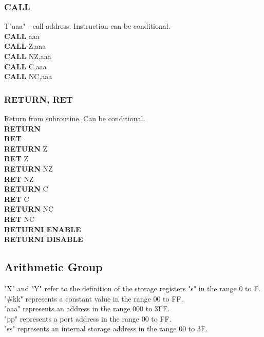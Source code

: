         \subsubsection{CALL}
            T"aaa" - call address. Instruction can be conditional.\\
            \textbf{CALL} aaa\\
            \textbf{CALL} Z,aaa\\
            \textbf{CALL} NZ,aaa\\
            \textbf{CALL} C,aaa\\
            \textbf{CALL} NC,aaa\\

        \subsubsection{RETURN, RET}
            Return from subroutine. Can be conditional.\\
            \textbf{RETURN}\\
            \textbf{RET}\\
            \textbf{RETURN} Z\\
            \textbf{RET} Z\\
            \textbf{RETURN} NZ\\
            \textbf{RET} NZ\\
            \textbf{RETURN} C\\
            \textbf{RET} C\\
            \textbf{RETURN} NC\\
            \textbf{RET} NC\\
            \textbf{RETURNI ENABLE}\\
            \textbf{RETURNI DISABLE}\\

    \subsection{Arithmetic Group}
        "X" and "Y" refer to the definition of the storage registers "s" in the range 0 to F.\\
        "\#kk" represents a constant value in the range 00 to FF.\\
        "aaa" represents an address in the range 000 to 3FF.\\
        "pp" represents a port address in the range 00 to FF.\\
        "ss" represents an internal storage address in the range 00 to 3F.\\

